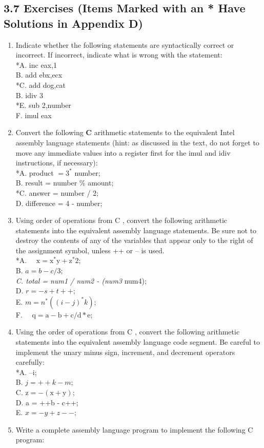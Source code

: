 \documentclass[10pt]{article}
\begin{document}
\subsection*{3.7 Exercises (Items Marked with an * Have Solutions in Appendix D)}
\begin{enumerate}
  \item Indicate whether the following statements are syntactically correct or incorrect. If incorrect, indicate what is wrong with the statement:\\
*A. inc eax,1\\
B. add ebx,ecx\\
*C. add dog,cat\\
B. idiv 3\\
*E. sub 2,number\\
F. imul eax
  \item Convert the following $\mathbf{C}$ arithmetic statements to the equivalent Intel assembly language statements (hint: as discussed in the text, do not forget to move any immediate values into a register first for the imul and idiv instructions, if necessary):\\
*A. product $=3^{*}$ number;\\
B. result = number \% amount;\\
*C. answer = number / 2;\\
D. difference = 4 - number;
  \item Using order of operations from C , convert the following arithmetic statements into the equivalent assembly language statements. Be sure not to destroy the contents of any of the variables that appear only to the right of the assignment symbol, unless ++ or -- is used.\\
*A. $\quad \mathrm{x}=\mathrm{x}^{*} \mathrm{y}+\mathrm{z}^{*} 2$;\\
B. $a=b-c / 3 ;$\\
\textit{C. total = num1 / num2 - (num3} num4);\\
D. $r=-s+t++$;\\
E. $m=n^{*}\left((i-j)^{*} k\right)$;\\
F. $\quad \mathrm{q}=\mathrm{a}-\mathrm{b}+\mathrm{c} / \mathrm{d} * \mathrm{e}$;
  \item Using the order of operations from C , convert the following arithmetic statements into the equivalent assembly language code segment. Be careful to implement the unary minus sign, increment, and decrement operators carefully:\\
*A. --i;\\
B. $j=++k-m$;\\
C. $\mathrm{z}=-(\mathrm{x}+\mathrm{y})$;\\
D. a = ++b - c++;\\
E. $x=-y+z--;$
  \item Write a complete assembly language program to implement the following C program:
\end{enumerate}
\end{document}
